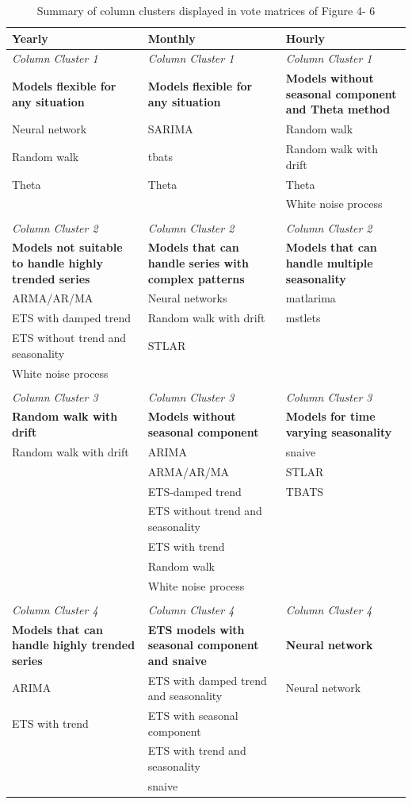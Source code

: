 \documentclass[11pt,a4paper,]{article}
\begin{document}
\begin{table}[!h]
\centering\scriptsize\tabcolsep=0.12cm
\caption{Summary of column clusters displayed in vote matrices of Figure 4- 6 }
\label{cclusters}
\begin{tabular}{p{5cm}p{5cm}p{5cm}}
\hline
\textbf{Yearly} & \textbf{Monthly} & \textbf{Hourly} \\ \hline
\textit{Column Cluster 1}&\textit{Column Cluster 1} & \textit{Column Cluster 1} \\
\textbf{Models flexible for any situation} & \textbf{Models flexible for any situation} & \textbf{Models without seasonal component and Theta method } \\
Neural network & SARIMA & Random walk\\
Random walk & tbats & Random walk with drift\\
Theta & Theta & Theta\\
&  & White noise process\\
&  & \\
\textit{Column Cluster 2}&\textit{Column Cluster 2} & \textit{Column Cluster 2} \\
\textbf{Models not suitable to handle highly trended series} & \textbf{Models that can handle series with complex patterns} & \textbf{Models that can handle multiple seasonality } \\
ARMA/AR/MA & Neural networks & matlarima\\
ETS with damped trend & Random walk with drift & mstlets\\
ETS without trend and seasonality & STLAR & \\
White noise process &  & \\
& & \\
\textit{Column Cluster 3}&\textit{Column Cluster 3} & \textit{Column Cluster 3} \\
\textbf{Random walk with drift} & \textbf{Models without seasonal component} & \textbf{Models for time varying seasonality} \\
Random walk with drift & ARIMA & snaive\\
 & ARMA/AR/MA & STLAR\\
 & ETS-damped trend & TBATS\\
 & ETS without trend and seasonality & \\
  & ETS with trend  & \\
  & Random walk  & \\
  & White noise process & \\
& & \\
\textit{Column Cluster 4}&\textit{Column Cluster 4} & \textit{Column Cluster 4} \\
\textbf{Models that can handle highly trended series} & \textbf{ETS models with seasonal component and snaive} & \textbf{Neural network} \\
ARIMA & ETS with damped trend and seasonality & Neural network\\
ETS with trend & ETS with seasonal component & \\
 & ETS with trend and seasonality & \\
 & snaive & \\ \hline
\end{tabular}
\end{table}
\end{document}
